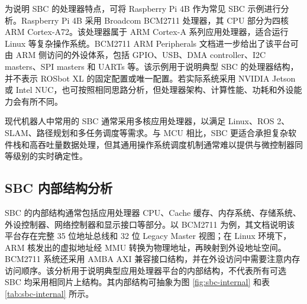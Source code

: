 \documentclass[UTF8,a4paper,12pt]{ctexrep}
\begin{document}
为说明 SBC 的处理器特点，可将 Raspberry Pi 4B 作为常见 SBC 示例进行分析。Raspberry Pi 4B 采用 Broadcom BCM2711 处理器，其 CPU 部分为四核 ARM Cortex-A72。该处理器属于 ARM Cortex-A 系列应用处理器，适合运行 Linux 等复杂操作系统。BCM2711 ARM Peripherals 文档进一步给出了该平台可由 ARM 侧访问的外设体系，包括 GPIO、USB、DMA controller、I2C masters、SPI masters 和 UARTs 等。该示例用于说明典型 SBC 的处理器结构，并不表示 ROSbot XL 的固定配置或唯一配置。若实际系统采用 NVIDIA Jetson 或 Intel NUC，也可按照相同思路分析，但处理器架构、计算性能、功耗和外设能力会有所不同。

现代机器人中常用的 SBC 通常采用多核应用处理器，以满足 Linux、ROS 2、SLAM、路径规划和多任务调度等需求。与 MCU 相比，SBC 更适合承担复杂软件栈和高吞吐量数据处理，但其通用操作系统调度机制通常难以提供与微控制器同等级别的实时确定性。

\subsection{SBC 内部结构分析}

SBC 的内部结构通常包括应用处理器 CPU、Cache 缓存、内存系统、存储系统、外设控制器、网络控制器和显示接口等部分。以 BCM2711 为例，其文档说明该平台存在完整 35 位地址总线和 32 位 Legacy Master 视图；在 Linux 环境下，ARM 核发出的虚拟地址经 MMU 转换为物理地址，再映射到外设地址空间。BCM2711 系统还采用 AMBA AXI 兼容接口结构，并在外设访问中需要注意内存访问顺序。该分析用于说明典型应用处理器平台的内部结构，不代表所有可选 SBC 均采用相同片上结构。其内部结构可抽象为图 \ref{fig:sbc-internal} 和表 \ref{tab:sbc-internal} 所示。
\end{document}

